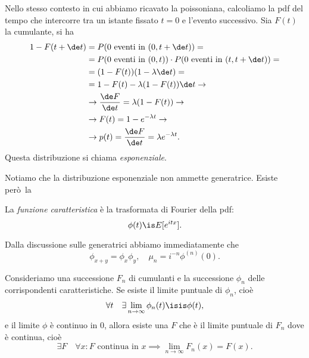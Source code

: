 Nello stesso contesto in cui abbiamo ricavato la poissoniana,
calcoliamo la pdf del tempo che intercorre tra un istante fissato $t=0$ e l'evento successivo.
Sia $F(t)$ la cumulante, si ha
\begin{align*}
	1-F(t+\de t)
	&= P(\text{$0$ eventi in $(0,t+\de t)$}) = \\
	&= P(\text{$0$ eventi in $(0,t)$}) \cdot P(\text{$0$ eventi in $(t,t+\de t)$}) = \\
	&= (1-F(t)) (1-\lambda\de t) = \\
	&= 1 - F(t) - \lambda(1-F(t))\de t \rightarrow \\
	&\rightarrow \frac{\de F}{\de t} = \lambda(1-F(t)) \rightarrow \\
	&\rightarrow F(t) = 1 - e^{-\lambda t} \rightarrow \\
	&\rightarrow p(t) = \frac{\de F}{\de t} = \lambda e^{-\lambda t}.
\end{align*}
Questa distribuzione si chiama \emph{esponenziale}.

Notiamo che la distribuzione esponenziale non ammette generatrice.
Esiste però~la
\begin{definition}
	La \emph{funzione caratteristica} è la trasformata di Fourier della pdf:
	\begin{equation*}
		\phi(t) \is E[e^{itx}].
	\end{equation*}
\end{definition}
Dalla discussione sulle generatrici abbiamo immediatamente che
\begin{equation*}
	\phi_{x+y} = \phi_x\phi_y, \quad \mu_n = i^{-n} \phi^{(n)}(0).
\end{equation*}

\begin{fact}
	Consideriamo una successione $F_n$ di cumulanti e la successione $\phi_n$ delle corrispondenti caratteristiche.
	Se esiste il limite puntuale di $\phi_n$, cioè
	\begin{equation*}
		\forall t \quad \exists \lim_{n\to\infty} \phi_n(t) \isis \phi(t),
	\end{equation*}
	e il limite $\phi$ è continuo in 0, allora
	esiste una $F$ che è il limite puntuale di $F_n$ dove è continua, cioè
	\begin{equation*}
		\exists F \quad \forall x: \text{$F$ continua in $x$} \implies
		\lim_{n\to\infty} F_n(x) = F(x).
	\end{equation*}
\end{fact}
